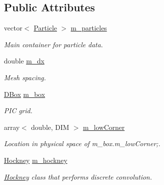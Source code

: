 \subsection*{Public Attributes}
\begin{DoxyCompactItemize}
\item 
\mbox{\label{class_particle_set_a6bb49eed6fe60ce44d9639cccc49d3fc}} 
vector$<$ \hyperlink{class_particle}{Particle} $>$ \hyperlink{class_particle_set_a6bb49eed6fe60ce44d9639cccc49d3fc}{m\+\_\+particles}
\begin{DoxyCompactList}\small\item\em Main container for particle data. \end{DoxyCompactList}\item 
\mbox{\label{class_particle_set_ab175df8fab554a1c069dc75330bd7ffb}} 
double \hyperlink{class_particle_set_ab175df8fab554a1c069dc75330bd7ffb}{m\+\_\+dx}
\begin{DoxyCompactList}\small\item\em Mesh spacing. \end{DoxyCompactList}\item 
\mbox{\label{class_particle_set_ae965763dcc0f6bca9a0d5ed6864ba581}} 
\hyperlink{class_d_box}{D\+Box} \hyperlink{class_particle_set_ae965763dcc0f6bca9a0d5ed6864ba581}{m\+\_\+box}
\begin{DoxyCompactList}\small\item\em P\+IC grid. \end{DoxyCompactList}\item 
\mbox{\label{class_particle_set_ae99b4064e3ee714f1d1e217c4fb519c6}} 
array$<$ double, D\+IM $>$ \hyperlink{class_particle_set_ae99b4064e3ee714f1d1e217c4fb519c6}{m\+\_\+low\+Corner}
\begin{DoxyCompactList}\small\item\em Location in physical space of m\+\_\+box.\+m\+\_\+low\+Corner;. \end{DoxyCompactList}\item 
\mbox{\label{class_particle_set_a681f750458d3c20a5e8685f1521cdbf0}} 
\hyperlink{class_hockney}{Hockney} \hyperlink{class_particle_set_a681f750458d3c20a5e8685f1521cdbf0}{m\+\_\+hockney}
\begin{DoxyCompactList}\small\item\em \hyperlink{class_hockney}{Hockney} class that performs discrete convolution. \end{DoxyCompactList}\end{DoxyCompactItemize}


